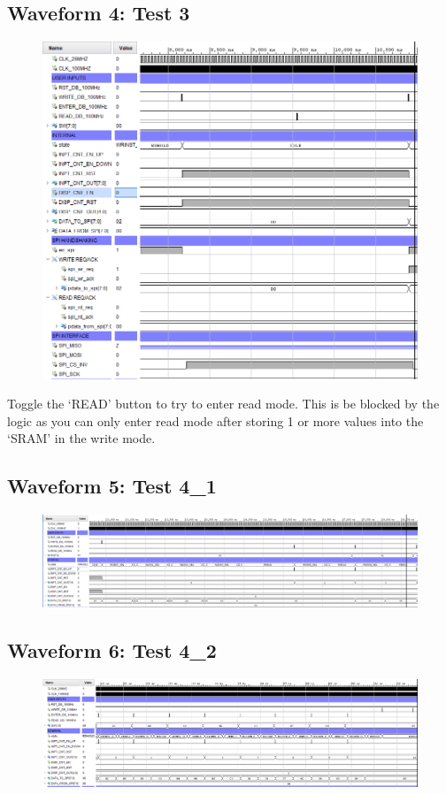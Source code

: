 \documentclass[11pt]{report}
\begin{document}
\subsection*{Waveform 4: Test 3}
\begin{figure}[H]
    \includegraphics[width=\columnwidth]{Assets/Test3.PNG}
\end{figure}

Toggle the `READ' button to try to enter read mode. This is be blocked by the logic as you can only enter read mode after storing 1 or more values into the `SRAM' in the write mode.

\subsection*{Waveform 5: Test 4\_1}
\begin{figure}[H]
    \includegraphics[width=\columnwidth]{Assets/Test4_1.PNG}
\end{figure}

\subsection*{Waveform 6: Test 4\_2}
\begin{figure}[H]
    \includegraphics[width=\columnwidth]{Assets/Test4_2.PNG}
\end{figure}
\end{document}

